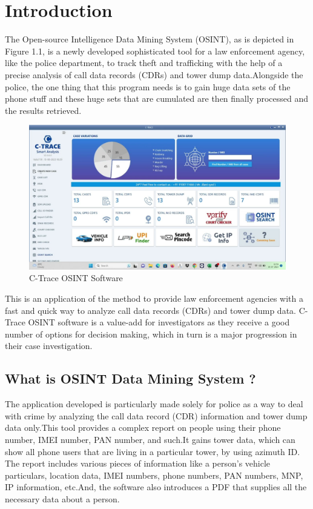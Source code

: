 \chapter{Introduction}
\justify

The Open-source Intelligence Data Mining System (OSINT), as is depicted in Figure 1.1, is a newly developed sophisticated tool for a law enforcement agency, like the police department, to track theft and trafficking with the help of a precise analysis of call data records (CDRs) and tower dump data.Alongside the police, the one thing that this program needs is to gain huge data sets of the phone stuff and these huge sets that are cumulated are then finally processed and the results retrieved.

\begin{figure}
    \centering
    \includegraphics[width=1\linewidth]{Media/maxresdefault}
    \caption{C-Trace OSINT Software}
    \label{fig:CTraceOSINTSoftware}
\end{figure}

This is an application of the method to provide law enforcement agencies with a fast and quick way to analyze call data records (CDRs) and tower dump data.
C-Trace OSINT software is a value-add for investigators as they receive a good number of options for decision making, which in turn is a major progression in their case investigation.

\section{What is OSINT Data Mining System ?}\label{sec:what-is-osint-data-mining-system-?}

The application developed is particularly made solely for police as a way to deal with crime by analyzing the call data record (CDR) information and tower dump data only.This tool provides a complex report on people using their phone number, IMEI number, PAN number, and such.It gains tower data, which can show all phone users that are living in a particular tower, by using azimuth ID. The report includes various pieces of information like a person's vehicle particulars, location data, IMEI numbers, phone numbers, PAN numbers, MNP, IP information, etc.And, the software also introduces a PDF that supplies all the necessary data about a person.

